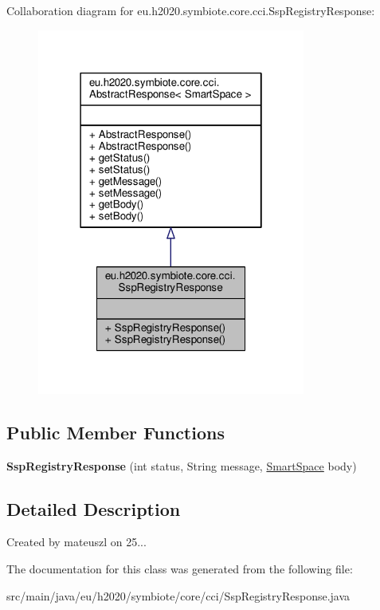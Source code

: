 Collaboration diagram for eu.\+h2020.\+symbiote.\+core.\+cci.\+Ssp\+Registry\+Response\+:
\nopagebreak
\begin{figure}[H]
\begin{center}
\leavevmode
\includegraphics[width=250pt]{classeu_1_1h2020_1_1symbiote_1_1core_1_1cci_1_1SspRegistryResponse__coll__graph}
\end{center}
\end{figure}
\subsection*{Public Member Functions}
\begin{DoxyCompactItemize}
\item 
\mbox{\label{classeu_1_1h2020_1_1symbiote_1_1core_1_1cci_1_1SspRegistryResponse_a54da4b7875c0f03d6e277b9abbdbe1f5}} 
{\bfseries Ssp\+Registry\+Response} (int status, String message, \hyperlink{classeu_1_1h2020_1_1symbiote_1_1model_1_1mim_1_1SmartSpace}{Smart\+Space} body)
\end{DoxyCompactItemize}


\subsection{Detailed Description}
Created by mateuszl on 25... 

The documentation for this class was generated from the following file\+:\begin{DoxyCompactItemize}
\item 
src/main/java/eu/h2020/symbiote/core/cci/Ssp\+Registry\+Response.\+java\end{DoxyCompactItemize}
